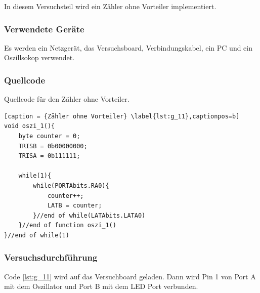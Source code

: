 \documentclass[12pt,a4paper]{article}
\begin{document}
In diesem Versuchsteil wird ein Zähler ohne Vorteiler implementiert.

\subsubsection*{Verwendete Geräte}

Es werden ein Netzgerät, das Versuchsboard, Verbindungskabel, ein PC und ein Oszillsokop verwendet.

\subsubsection*{Quellcode}

Quellcode für den Zähler ohne Vorteiler.

\lstset{language=C, basicstyle=\tiny}
\begin{lstlisting}[caption = {Zähler ohne Vorteiler} \label{lst:g_11},captionpos=b]
void oszi_1(){
	byte counter = 0;
	TRISB = 0b00000000;
	TRISA = 0b111111;
	
	while(1){
		while(PORTAbits.RA0){
			counter++;
			LATB = counter;
		}//end of while(LATAbits.LATA0)
	}//end of function oszi_1()
}//end of while(1)
\end{lstlisting}

\subsubsection*{Versuchsdurchführung}

Code \ref{lst:g_11} wird auf das Versuchboard geladen. Dann wird Pin 1 von Port A mit dem Oszillator und Port B mit dem LED Port verbunden.
\end{document}
